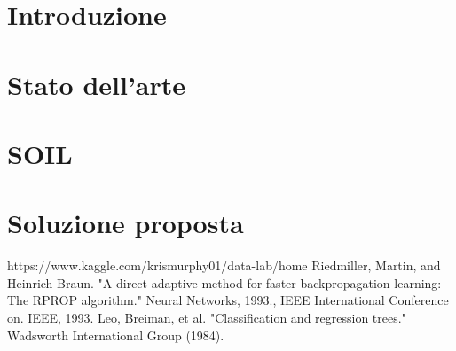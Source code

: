 \documentclass[11pt, english]{article}
\begin{document}
\tableofcontents

\newpage

\section{Introduzione}

\section{Stato dell'arte}


\section{SOIL}


\section{Soluzione proposta}

\begin{thebibliography}{12}
     https://www.kaggle.com/krismurphy01/data-lab/home
     Riedmiller, Martin, and Heinrich Braun. "A direct adaptive method for faster backpropagation learning: The RPROP algorithm." Neural Networks, 1993., IEEE International Conference on. IEEE, 1993.
     Leo, Breiman, et al. "Classification and regression trees." Wadsworth International Group (1984).
\end{thebibliography}
    
\end{document}
